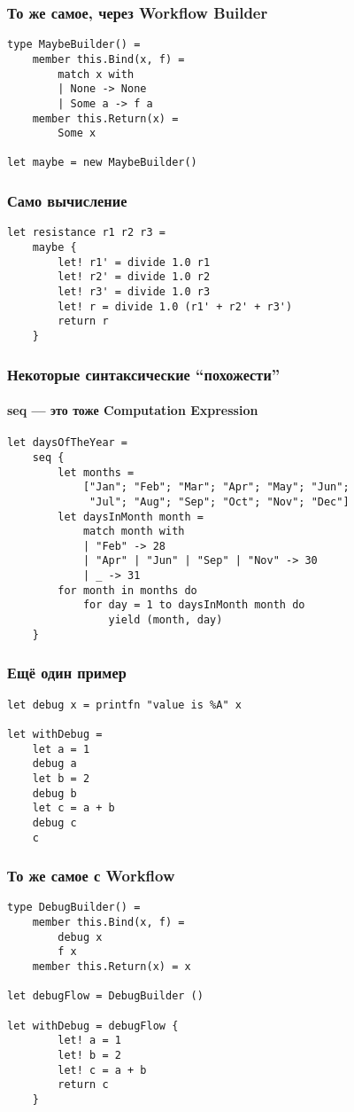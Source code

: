 \documentclass[xetex,mathserif,serif]{beamer}
\begin{document}
	\begin{frame}[fragile]
		\frametitle{То же самое, через Workflow Builder}
		\begin{verbatim}
type MaybeBuilder() =
    member this.Bind(x, f) = 
        match x with
        | None -> None
        | Some a -> f a
    member this.Return(x) = 
        Some x
   
let maybe = new MaybeBuilder()
		\end{verbatim}
	\end{frame}

	\begin{frame}[fragile]
		\frametitle{Само вычисление}
		\begin{verbatim}
let resistance r1 r2 r3 = 
    maybe {
        let! r1' = divide 1.0 r1
        let! r2' = divide 1.0 r2
        let! r3' = divide 1.0 r3
        let! r = divide 1.0 (r1' + r2' + r3')
        return r
    }
		\end{verbatim}
	\end{frame}

	\begin{frame}[fragile]
		\frametitle{Некоторые синтаксические ``похожести''}
		\framesubtitle{seq --- это тоже Computation Expression}
		\begin{verbatim}
let daysOfTheYear =
    seq {
        let months =
            ["Jan"; "Feb"; "Mar"; "Apr"; "May"; "Jun";
             "Jul"; "Aug"; "Sep"; "Oct"; "Nov"; "Dec"]
        let daysInMonth month =
            match month with
            | "Feb" -> 28
            | "Apr" | "Jun" | "Sep" | "Nov" -> 30
            | _ -> 31
        for month in months do
            for day = 1 to daysInMonth month do
                yield (month, day)
    }
		\end{verbatim}
	\end{frame}

	\begin{frame}[fragile]
		\frametitle{Ещё один пример}
		\begin{verbatim}
let debug x = printfn "value is %A" x

let withDebug = 
    let a = 1
    debug a
    let b = 2
    debug b
    let c = a + b
    debug c
    c
		\end{verbatim}
	\end{frame}

	\begin{frame}[fragile]
		\frametitle{То же самое с Workflow}
		\begin{verbatim}
type DebugBuilder() =
    member this.Bind(x, f) = 
        debug x 
        f x
    member this.Return(x) = x

let debugFlow = DebugBuilder ()

let withDebug = debugFlow {
        let! a = 1
        let! b = 2
        let! c = a + b
        return c
    }
		\end{verbatim}
	\end{frame}
\end{document}
